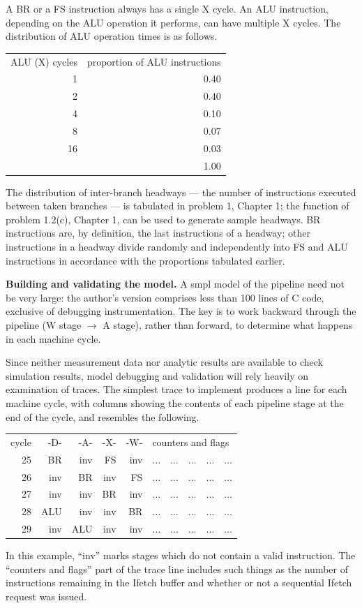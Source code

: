 A BR or a FS instruction always has a single X cycle. An ALU instruction,
depending on the ALU operation it performs, can have multiple X cycles.
The distribution of ALU operation times is as follows.
\begin{center}
\begin{tabular}{rr}
ALU (X) cycles & proportion of ALU instructions \\
1 & 0.40 \\
2 & 0.40 \\
4 & 0.10 \\
8 & 0.07 \\
16 & 0.03 \\
 & 1.00
\end{tabular}
\end{center}

The distribution of inter-branch headways --- the number of instructions
executed between taken branches --- is tabulated in problem 1, Chapter 1; the
function of problem 1.2(c), Chapter 1, can be used to generate sample
headways. BR instructions are, by definition, the last instructions of a
headway; other instructions in a headway divide randomly and independently
into FS and ALU instructions in accordance with the proportions
tabulated earlier.

\noindent\textbf{Building and validating the model.} A smpl model of the pipeline need
not be very large: the author's version comprises less than 100 lines of C code,
exclusive of debugging instrumentation. The key is to work backward
through the pipeline (W stage $\rightarrow$ A stage), rather than forward, to determine
what happens in each machine cycle.

Since neither measurement data nor analytic results are available to
check simulation results, model debugging and validation will rely heavily
on examination of traces. The simplest trace to implement produces a line for
each machine cycle, with columns showing the contents of each pipeline
stage at the end of the cycle, and resembles the following.
\begin{center}
\begin{tabular}{rrrrrl}
cycle & -D- & -A- & -X- & -W- & counters and flags \\
25 & BR & inv & FS & inv & $\ldots\quad\ldots\quad\ldots\quad\ldots\quad\ldots$ \\
26 & inv & BR & inv & FS & $\ldots\quad\ldots\quad\ldots\quad\ldots\quad\ldots$ \\
27 & inv & inv & BR & inv & $\ldots\quad\ldots\quad\ldots\quad\ldots\quad\ldots$ \\
28 & ALU & inv & inv & BR & $\ldots\quad\ldots\quad\ldots\quad\ldots\quad\ldots$ \\
29 & inv & ALU & inv & inv & $\ldots\quad\ldots\quad\ldots\quad\ldots\quad\ldots$
\end{tabular}
\end{center}
In this example, ``inv'' marks stages which do not contain a valid instruction.
The ``counters and flags'' part of the trace line includes such things as the
number of instructions remaining in the Ifetch buffer and whether or not a
sequential Ifetch request was issued.

